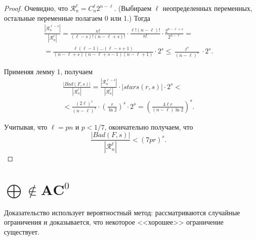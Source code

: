 \documentclass[12pt]{article}
\theoremstyle{plain}
\theoremstyle{remark}
\theoremstyle{definition}
\begin{document}
\begin{proof}
Очевидно, что $\mathcal{R}_n^{\ell} = C_n^\ell  2 ^{n - \ell}$. (Выбираем $\ell$ неопределенных переменных, остальные переменные полагаем 0 или 1.)
Тогда
\begin{gather*} \frac{|\mathcal{R}_n^{\ell - s}|}{|\mathcal{R}_n^{\ell}|} = \frac{n!}{(\ell - s)!(n - \ell + s)!} \cdot \frac{\ell!(n - \ell)!}{n!} \cdot \frac{2^{n - \ell + s}}{2^{n - \ell}} = \\ = \frac{\ell  (\ell - 1) \ldots (\ell - s + 1) }{(n - \ell + s)(n - \ell + s - 1)(n - \ell + 1) } \cdot 2^s \le \frac{\ell^s}{(n - \ell)^s} \cdot 2^s.
\end{gather*}

Применяя лемму 1, получаем 
\begin{gather*}
\frac{|Bad(F, s)|}{|\mathcal{R}_n^{\ell}|} = \frac{|\mathcal{R}_n^{\ell - s}|}{|\mathcal{R}_n^{\ell}|} \cdot |stars(r, s)| \cdot 2^s < \\ < \frac{(2\ell)^s}{(n - \ell)^s} \cdot  \left( \frac{r}{\ln2}\right)^s \cdot 2^s = \left( \frac{4\ell r}{(n - \ell)\ln2} \right)^s.
\end{gather*}

Учитывая, что $\ell = pn$ и $p < 1/7$, окончательно получаем, что 
\[ \frac{|Bad(F, s)|}{|\mathcal{R}_n^{\ell}|} < (7pr)^s. \]

\end{proof}

\section{$\bigoplus \notin \mathbf{AC}^0$ }
Доказательство использует вероятностный метод: рассматриваются случайные ограничения и доказывается, что некоторое <<хорошее>> ограничение существует.
\end{document}
